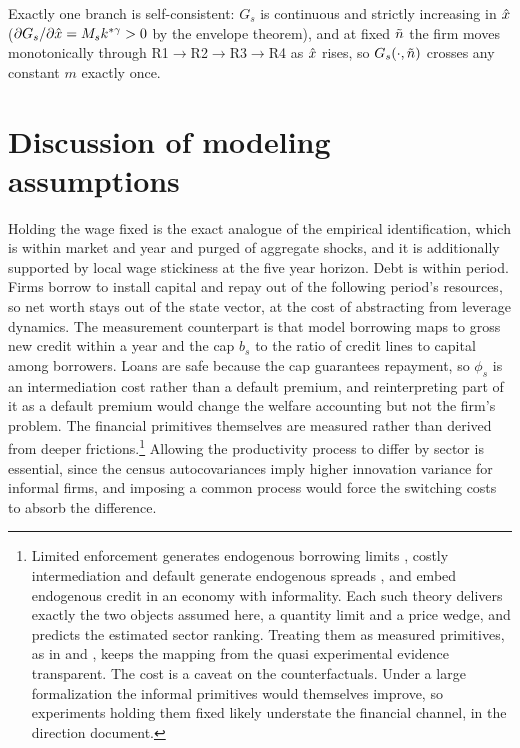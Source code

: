 \documentclass[12pt]{article}
\begin{document}
Exactly one branch is self-consistent: $G_{s}$ is continuous and
strictly increasing in $\hat{x}$
($\partial G_{s}/\partial\hat{x}=M_{s}k^{*\gamma}>0$ by the envelope
theorem), and at fixed $\tilde{n}$ the firm moves monotonically
through R1$\to$R2$\to$R3$\to$R4 as $\hat{x}$ rises, so
$G_{s}(\cdot,\tilde{n})$ crosses any constant $m$ exactly once.

\section{Discussion of modeling assumptions}
\label{sec:gen-discussion}

Holding the wage fixed is the exact analogue of the empirical identification, which is within market and year and purged of aggregate shocks, and it is additionally supported by local wage stickiness at the five year horizon. Debt is within period. Firms borrow to install capital and repay out of the following period's resources, so net worth stays out of the state vector, at the cost of abstracting from leverage dynamics. The measurement counterpart is that model borrowing maps to gross new credit within a year and the cap $b_{s}$ to the ratio of credit lines to capital among borrowers. Loans are safe because the cap guarantees repayment, so $\phi_{s}$ is an intermediation cost rather than a default premium, and reinterpreting part of it as a default premium would change the welfare accounting but not the firm's problem. The financial primitives themselves are measured rather than derived from deeper frictions.\footnote{Limited enforcement generates endogenous borrowing limits \citep{albuquerque2004optimal,clementi2006theory}, costly intermediation and default generate endogenous spreads \citep{cooley2001financial,arellano2012firm}, and \citet{d2012financial} embed endogenous credit in an economy with informality. Each such theory delivers exactly the two objects assumed here, a quantity limit and a price wedge, and predicts the estimated sector ranking. Treating them as measured primitives, as in \citet{midrigan2014finance} and \citet{moll2014productivity}, keeps the mapping from the quasi experimental evidence transparent. The cost is a caveat on the counterfactuals. Under a large formalization the informal primitives would themselves improve, so experiments holding them fixed likely understate the financial channel, in the direction \citet{brooks2020credit} document.} Allowing the productivity process to differ by sector is essential, since the census autocovariances imply higher innovation variance for informal firms, and imposing a common process would force the switching costs to absorb the difference.
\end{document}
